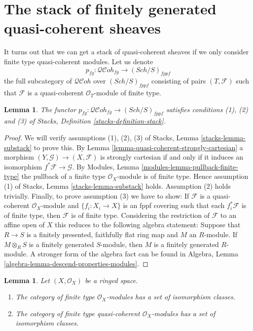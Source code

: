\documentclass{stacks-project}
\theoremstyle{plain}
\newtheorem{lemma}[subsection]{Lemma}
\theoremstyle{definition}
\theoremstyle{remark}
\numberwithin{equation}{subsection}
\def\Sch{\mathit{Sch}}
\def\QCohstack{\mathcal{QC}\!\mathit{oh}}
\begin{document}
\section{The stack of finitely generated quasi-coherent sheaves}
\label{section-stack-of-finitely-generated-quasi-coherent-sheaves}

\noindent
It turns out that we can get a stack of quasi-coherent sheaves
if we only consider finite type quasi-coherent modules.
Let us denote
$$
p_{fg} : \QCohstack_{fg} \to (\Sch/S)_{fppf}
$$
the full subcategory of $\QCohstack$ over $(\Sch/S)_{fppf}$
consisting of pairs $(T, \mathcal{F})$ such that $\mathcal{F}$
is a quasi-coherent $\mathcal{O}_T$-module of finite type.

\begin{lemma}
\label{lemma-stack-of-finite-type-quasi-coherent-sheaves}
The functor $p_{fg} : \QCohstack_{fg} \to (\Sch/S)_{fppf}$
satisfies conditions (1), (2) and (3) of
Stacks, Definition \ref{stacks-definition-stack}.
\end{lemma}

\begin{proof}
We will verify assumptions (1), (2), (3) of
Stacks, Lemma \ref{stacks-lemma-substack}
to prove this. By
Lemma \ref{lemma-quasi-coherent-strongly-cartesian}
a morphism $(Y, \mathcal{G}) \to (X, \mathcal{F})$ is
strongly cartesian if and only if it induces an isomorphism
$f^*\mathcal{F} \to \mathcal{G}$. By
Modules, Lemma \ref{modules-lemma-pullback-finite-type}
the pullback of a finite type $\mathcal{O}_X$-module is of finite
type. Hence assumption (1) of
Stacks, Lemma \ref{stacks-lemma-substack}
holds. Assumption (2) holds trivially.
Finally, to prove assumption (3) we have to show:
If $\mathcal{F}$ is a quasi-coherent $\mathcal{O}_X$-module
and $\{f_i : X_i \to X\}$ is an fppf covering such that each
$f_i^*\mathcal{F}$ is of finite type, then $\mathcal{F}$ is of
finite type. Considering the restriction of $\mathcal{F}$ to
an affine open of $X$ this reduces to the following algebra statement:
Suppose that $R \to S$ is a finitely presented, faithfully flat ring map
and $M$ an $R$-module. If $M \otimes_R S$ is a finitely generated
$S$-module, then $M$ is a finitely generated $R$-module.
A stronger form of the algebra fact can be found in
Algebra, Lemma \ref{algebra-lemma-descend-properties-modules}.
\end{proof}

\begin{lemma}
\label{lemma-finite-type}
Let $(X, \mathcal{O}_X)$ be a ringed space.
\begin{enumerate}
\item The category of finite type $\mathcal{O}_X$-modules has a
set of isomorphism classes.
\item The category of finite type quasi-coherent
$\mathcal{O}_X$-modules has a set of isomorphism classes.
\end{enumerate}
\end{lemma}
\end{document}
